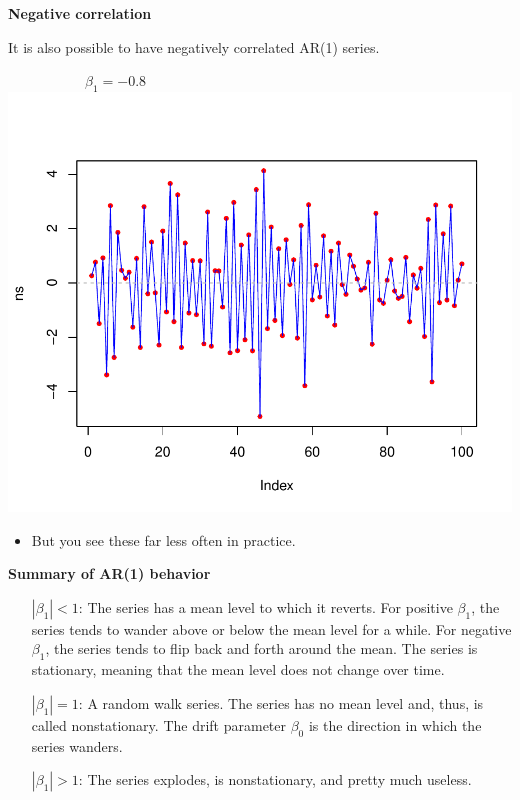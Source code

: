 \documentclass[12pt,xcolor=svgnames]{beamer}
\newcommand{\theme}{\color{FireBrick}}
\newcommand{\sk}{\vspace{.4cm}}
\newcommand{\chap}[1]{{\theme \Large \bf #1} \sk}
\begin{document}
\begin{frame}
\chap{Negative correlation}

It is also possible to have negatively correlated AR(1) series.

\vspace{0.55cm}
\begin{minipage}{7cm}
\centering
\ \ \ \ \ \ \ \ \ \ \ $\beta_1 = -0.8$\\
\includegraphics[scale=0.55,trim=15 50 0 50]{negcor_new}
\sk
\end{minipage}\hfill
\begin{minipage}{3cm}
\begin{itemize}
\item But you see these far less often in practice.
\end{itemize}
\end{minipage}

\end{frame}

\begin{frame}
\chap{Summary of AR(1) behavior}

\vspace{0.25cm}
\hfill \begin{minipage}{10.25cm}
\begin{itemize}
\item[$|\beta_1| < 1$:]
The series has a mean level to which it reverts.  For 
positive $\beta_1$, the series tends to wander above or below 
the mean level for a while.  For negative $\beta_1$, the series 
tends to flip back and forth around the mean. 
The series is stationary, meaning that the 
mean level does not change over time.  
\item[$|\beta_1| = 1$:] A random walk series.
The series has no mean level and, thus, is called 
nonstationary.  The drift parameter $\beta_0$ is the direction in 
which the series wanders.
\item[$|\beta_1| > 1$:] 
The series explodes, is nonstationary, and pretty much useless.
\end{itemize}
\end{minipage}
\end{frame}
\end{document}
